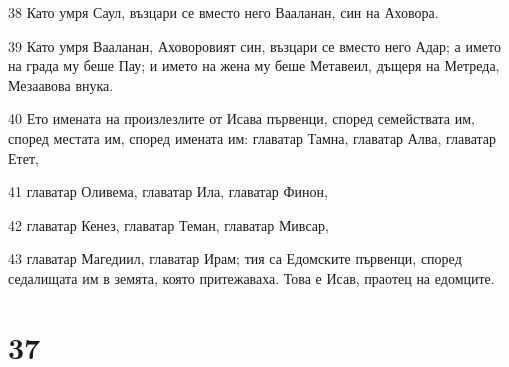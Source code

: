 \par 38 Като умря Саул, възцари се вместо него Вааланан, син на Аховора.
\par 39 Като умря Вааланан, Аховоровият син, възцари се вместо него Адар; а името на града му беше Пау; и името на жена му беше Метавеил, дъщеря на Метреда, Мезаавова внука.
\par 40 Ето имената на произлезлите от Исава първенци, според семействата им, според местата им, според имената им: главатар Тамна, главатар Алва, главатар Етет,
\par 41 главатар Оливема, главатар Ила, главатар Финон,
\par 42 главатар Кенез, главатар Теман, главатар Мивсар,
\par 43 главатар Магедиил, главатар Ирам; тия са Едомските първенци, според седалищата им в земята, която притежаваха. Това е Исав, праотец на едомците.

\chapter{37}

